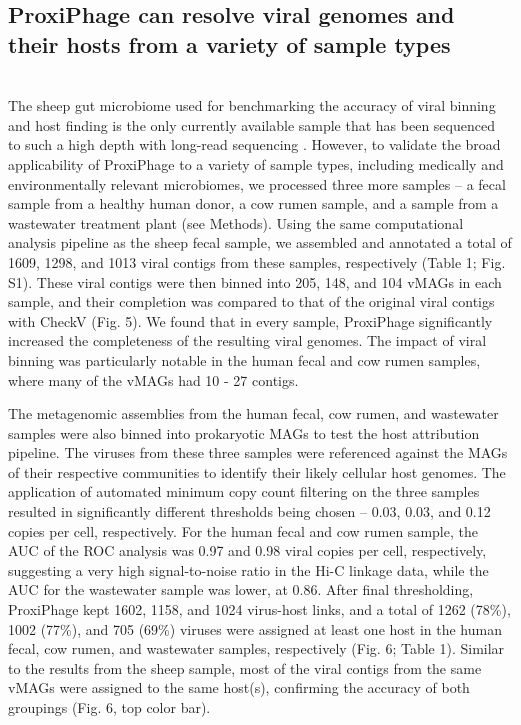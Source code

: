     

\subsection*{ProxiPhage can resolve viral genomes and their hosts from a variety of sample types} \hfill\\
	The sheep gut microbiome used for benchmarking the accuracy of viral binning and host finding is the only currently available sample that has been sequenced to such a high depth with long-read sequencing \cite{RN15}. However, to validate the broad applicability of ProxiPhage to a variety of sample types, including medically and environmentally relevant microbiomes, we processed three more samples – a fecal sample from a healthy human donor, a cow rumen sample, and a sample from a wastewater treatment plant (see Methods). Using the same computational analysis pipeline as the sheep fecal sample, we assembled and annotated a total of 1609, 1298, and 1013 viral contigs from these samples, respectively (Table 1; Fig. S1). These viral contigs were then binned into 205, 148, and 104 vMAGs in each sample, and their completion was compared to that of the original viral contigs with CheckV (Fig. 5). We found that in every sample, ProxiPhage significantly increased the completeness of the resulting viral genomes. The impact of viral binning was particularly notable in the human fecal and cow rumen samples, where many of the vMAGs had 10 - 27 contigs.
	
	The metagenomic assemblies from the human fecal, cow rumen, and wastewater samples were also binned into prokaryotic MAGs to test the host attribution pipeline. The viruses from these three samples were referenced against the MAGs of their respective communities to identify their likely cellular host genomes. The application of automated minimum copy count filtering on the three samples resulted in significantly different thresholds being chosen – 0.03, 0.03, and 0.12 copies per cell, respectively. For the human fecal and cow rumen sample, the AUC of the ROC analysis was 0.97 and 0.98 viral copies per cell, respectively, suggesting a very high signal-to-noise ratio in the Hi-C linkage data, while the AUC for the wastewater sample was lower, at 0.86. After final thresholding, ProxiPhage kept 1602, 1158, and 1024 virus-host links, and a total of 1262 (78\%), 1002 (77\%), and 705 (69\%) viruses were assigned at least one host in the human fecal, cow rumen, and wastewater samples, respectively (Fig. 6; Table 1). Similar to the results from the sheep sample, most of the viral contigs from the same vMAGs were assigned to the same host(s), confirming the accuracy of both groupings (Fig. 6, top color bar).



